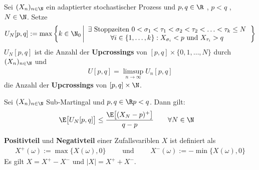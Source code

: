 \begin{defi}
Sei $(X_n)_{n\in\N}$ ein adaptierter stochastischer Prozess und $p,q\in\R$ , $p<q$ , $N\in\N$. Setze %
\begin{align*}
	U_N[p,q]:=\max\left\{ k\in\N_0\left|
\begin{array}{c}
	\exists\text{ Stoppzeiten }0<\sigma_1<\tau_1<\sigma_2<\tau_2<\ldots<\tau_k\le N\\
	\forall i\in\lbrace 1,\ldots,k\rbrace: X_{\sigma_i}<p \text{ und } X_{\tau_i}>q
\end{array}\right.\right\} %
\end{align*}
$U_N[p,q]$ ist die Anzahl der \textbf{Upcrossings} von $[p,q]\times\lbrace0,1,\ldots,N\rbrace$ durch $(X_n)_{n\in\N}$ und 
\begin{align*}
U[p,q]=\limsup\limits_{n\to\infty} U_n[p,q]
\end{align*}
die Anzahl der \textbf{Upcrossings} von $[p,q]\times\N$.
\end{defi}

\setcounter{section}{4} %
\begin{lemma}\enter\label{lemma4.1DoobsUpcrossingLemma}
Sei $(X_n)_{n\in\N}$ Sub-Martingal und $p,q\in\R\mit p<q$. Dann gilt:
\begin{align*}
\E\big[U_N[p,q]\big]&\leq\frac{\E\big[(X_N-p)^+\big]}{q-p}\qquad\forall N\in\N
\end{align*}
\end{lemma}

\begin{bemerkung}
\textbf{Positivteil} und \textbf{Negativteil} einer Zufallsvariblen $X$ ist definiert als
\begin{align*}
X^+(\omega):=\max\big\lbrace X(\omega),0\big\rbrace
\qquad\text{ und }\qquad
X^-(\omega):=-\min\big\lbrace X(\omega),0\big\rbrace
\end{align*}
Es gilt $X=X^+-X^-$ und $|X|=X^++X^-$.
\end{bemerkung}

